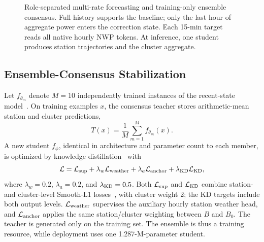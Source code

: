 \documentclass[conference]{IEEEtran}
\begin{document}
\begin{figure}[t]
{%
}
\caption{Role-separated multi-rate forecasting and training-only ensemble consensus. Full history supports the baseline; only the last hour of aggregate power enters the correction state. Each 15-min target reads all native hourly NWP tokens. At inference, one student produces station trajectories and the cluster aggregate.}
\label{fig:architecture}
\end{figure}

\subsection{Ensemble-Consensus Stabilization}

Let $f_{\theta_m}$ denote $M=10$ independently trained instances of the recent-state model~\cite{ref_ensemble}. On training examples $x$, the consensus teacher stores arithmetic-mean station and cluster predictions,
\begin{equation}
 T(x)=\frac{1}{M}\sum_{m=1}^{M} f_{\theta_m}(x).
 \label{eq:teacher}
\end{equation}
A new student $f_\phi$, identical in architecture and parameter count to each member, is optimized by knowledge distillation~\cite{ref_distill} with
\begin{equation}
 \mathcal L=\mathcal L_{\rm sup}
 +\lambda_w\mathcal L_{\rm weather}
 +\lambda_a\mathcal L_{\rm anchor}
 +\lambda_{\rm KD}\mathcal L_{\rm KD},
 \label{eq:loss}
\end{equation}
where $\lambda_w=0.2$, $\lambda_a=0.2$, and $\lambda_{\rm KD}=0.5$. Both $\mathcal L_{\rm sup}$ and $\mathcal L_{\rm KD}$ combine station- and cluster-level Smooth-L1 losses~\cite{ref_huber}, with cluster weight 2; the KD targets include both output levels. $\mathcal L_{\rm weather}$ supervises the auxiliary hourly station weather head, and $\mathcal L_{\rm anchor}$ applies the same station/cluster weighting between $B$ and $B_0$. The teacher is generated only on the training set. The ensemble is thus a training resource, while deployment uses one 1.287-M-parameter student.
\end{document}
